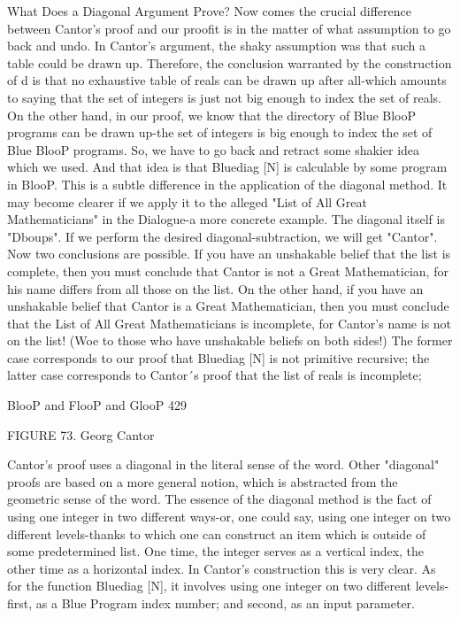                      What Does a Diagonal Argument Prove?
Now comes the crucial difference between Cantor's proof and our proofit is in the matter
of what assumption to go back and undo. In Cantor's argument, the shaky assumption
was that such a table could be drawn up. Therefore, the conclusion warranted by the
construction of d is that no exhaustive table of reals can be drawn up after all-which
amounts to saying that the set of integers is just not big enough to index the set of reals.
On the other hand, in our proof, we know that the directory of Blue BlooP programs can
be drawn up-the set of integers is big enough to index the set of Blue BlooP programs.
So, we have to go back and retract some shakier idea which we used. And that idea is that
Bluediag [N] is calculable by some program in BlooP. This is a subtle difference in the
application of the diagonal method.
        It may become clearer if we apply it to the alleged "List of All Great
Mathematicians" in the Dialogue-a more concrete example. The diagonal itself is
"Dboups". If we perform the desired diagonal-subtraction, we will get "Cantor". Now two
conclusions are possible. If you have an unshakable belief that the list is complete, then
you must conclude that Cantor is not a Great Mathematician, for his name differs from all
those on the list. On the other hand, if you have an unshakable belief that Cantor is a
Great Mathematician, then you must conclude that the List of All Great Mathematicians
is incomplete, for Cantor's name is not on the list! (Woe to those who have unshakable
beliefs on both sides!) The former case corresponds to our proof that Bluediag [N] is not
primitive recursive; the latter case corresponds to Cantor´s proof that the list of reals is
incomplete;




BlooP and FlooP and GlooP                                                               429

                                FIGURE 73. Georg Cantor

Cantor's proof uses a diagonal in the literal sense of the word. Other "diagonal" proofs are
based on a more general notion, which is abstracted from the geometric sense of the
word. The essence of the diagonal method is the fact of using one integer in two different
ways-or, one could say, using one integer on two different levels-thanks to which one can
construct an item which is outside of some predetermined list. One time, the integer
serves as a vertical index, the other time as a horizontal index. In Cantor's construction
this is very clear. As for the function Bluediag [N], it involves using one integer on two
different levels-first, as a Blue Program index number; and second, as an input parameter.

